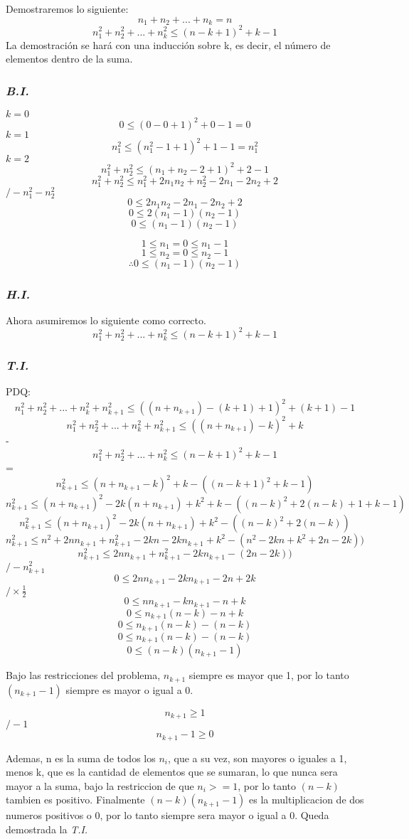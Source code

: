 \documentclass[../doc.tex]{subfiles}
\begin{document}
Demostraremos lo siguiente:
\[ n_1 + n_2 + ... + n_k = n \]
\[ n_1^2 + n_2^2 + ... + n_k^2 \leq (n-k+1)^2 + k -1\]
La demostración se hará con una inducción sobre k, es decir, el número de 
elementos dentro de la suma.

\subsubsection*{\emph{B.I.}}
$k=0$
\[0 \leq (0 - 0 +1)^2 + 0 -1 = 0\]
$k=1$
\[ n_1^2 \leq (n_1^2 - 1 + 1)^2 + 1 - 1 = n_1^2\]
$k=2$
\[ n_1^2 + n_2^2 \leq (n_1 + n_2 - 2 + 1)^2 + 2 -1  \]
\[ n_1^2 + n_2^2 \leq n_1^2 + 2n_1n_2+n_2^2-2n_1-2n_2+2 \]
\hspace*{0pt}\hfill $/ - n_1^2 - n_2^2$
\[ 0 \leq  2n_1n_2-2n_1-2n_2+2 \]
\[ 0 \leq 2(n_1 - 1)(n_2 - 1) \]
\[ 0 \leq (n_1 - 1)(n_2 -1) \]

\[ 1 \leq n_1 = 0 \leq n_1 - 1  \]
\[ 1 \leq n_2 = 0 \leq n_2 -1  \]
\[ \therefore  0 \leq (n_1 - 1)(n_2 -1)\]


\subsubsection*{\emph{H.I.}}
Ahora asumiremos lo siguiente como correcto.
\[ n_1^2 + n_2^2 + ... + n_k^2 \leq (n-k+1)^2 + k -1\]


\subsubsection*{\emph{T.I.}}
PDQ:
\[ n_1^2 + n_2^2 + ... + n_k^2 + n_{k+1}^2 \leq ((n + n_{k+1}) - (k+1) + 1)^2 + (k+1)-1 \]
\[ n_1^2 + n_2^2 + ... + n_k^2 + n_{k+1}^2 \leq ((n + n_{k+1}) - k)^2 + k \]
-\[   n_1^2 + n_2^2 + ... + n_k^2 \leq (n-k+1)^2 + k -1\]
=\[ n_{k+1}^2 \leq (n+n_{k+1} - k)^2 + k - ((n-k+1)^2 + k -1) \]
\[ n_{k+1}^2 \leq (n+n_{k+1})^2 - 2k(n+n_{k+1}) + k^2 + k - ((n-k)^2 + 2(n-k) + 1+ k -1) \]
\[ n_{k+1}^2 \leq (n+n_{k+1})^2 - 2k(n+n_{k+1}) + k^2 - ((n-k)^2 + 2(n-k)) \]
\[ n_{k+1}^2 \leq n^2 + 2nn_{k+1} + n_{k+1}^2 - 2kn -2kn_{k+1} + k^2  - (n^2 - 2kn +k^2 + 2n - 2k)) \]
\[ n_{k+1}^2 \leq 2nn_{k+1} + n_{k+1}^2 -2kn_{k+1} - ( 2n - 2k)) \]
\hspace*{0pt}\hfill $/ -n_{k+1}^2 $
\[ 0 \leq 2nn_{k+1} -2kn_{k+1} - 2n + 2k \]
\hspace*{0pt}\hfill $/ \times\frac{1}{2} $
\[ 0 \leq nn_{k+1} -kn_{k+1} - n + k \]
\[ 0 \leq n_{k+1}(n-k) - n + k \]
\[ 0 \leq n_{k+1}(n-k) - (n - k) \]
\[ 0 \leq n_{k+1}(n-k) - (n - k) \]
\[ 0 \leq (n-k)( n_{k+1}-1) \]

Bajo las restricciones del problema, $ n_{k+1} $ siempre es mayor que 1, por lo 
tanto $ (n_{k+1}-1) $ siempre es mayor o igual a 0. 

\[ n_{k+1} \geq 1 \]
\hspace*{0pt}\hfill $/ -1 $
\[ n_{k+1} - 1 \geq 0 \]

Ademas, n es la suma de todos los $ n_{i} $, que a su vez, son mayores o
iguales a 1, menos k, que es la cantidad de elementos que se sumaran, lo que
nunca sera mayor a la suma, bajo la restriccion de que  $ n_{i} >= 1 $, por lo
tanto $ (n-k) $ tambien es positivo. Finalmente $ (n-k)( n_{k+1}-1) $ es la
multiplicacion de dos numeros positivos o 0, por lo tanto siempre sera mayor o
igual a 0. Queda demostrada la \emph{T.I.}
\end{document}
